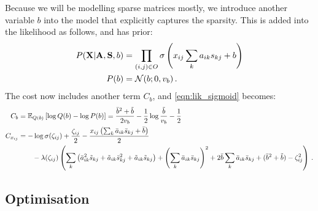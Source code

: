 \documentclass{article}
\newcommand{\obs}{O}
\newcommand{\X}{\mathbf{X}}
\newcommand{\A}{\mathbf{A}}
\newcommand{\s}{\mathbf{S}}
\newcommand{\N}{\mathcal{N}}
\newcommand{\atil}{\tilde{a}}
\newcommand{\abar}{\bar{a}}
\newcommand{\stil}{\tilde{s}}
\newcommand{\sbar}{\bar{s}}
\newcommand{\btil}{\tilde{b}}
\newcommand{\bbar}{\bar{b}}
\newcommand{\E}{\mathbb{E}}
\begin{document}
Because we will be modelling sparse matrices mostly, we introduce another variable $b$ into the model that explicitly captures the sparsity.
This is added into the likelihood as follows, and has prior:
\begin{align}
P(\X|\A,\s,b) &= \prod_{(i,j)\in\obs} \sigma \left(x_{ij}\sum_k a_{ik}s_{kj}+b\right)\notag\\
P(b) &= \N(b; 0, v_b) \notag\,.
\end{align}
The cost now includes another term $C_b$, and \eqref{eqn:lik_sigmoid} becomes:
\begin{align}
C_b &= \E_{Q(b)}\left[\log Q(b) - \log P(b)  \right]=\frac{\bbar^2+\btil}{2v_b}-\frac{1}{2}\log \frac{\btil}{v_b} - \frac{1}{2}\notag\\
C_{x_{ij}}
&=-\log\sigma(\zeta_{ij})+\frac{\zeta_{ij}}{2}-\frac{x_{ij}\left( \sum_k\abar_{ik}\sbar_{kj}+\bbar \right)}{2}\notag\\
&\qquad -\lambda(\zeta_{ij})\left(
\sum_k\left(\abar_{ik}^2\stil_{kj}+\atil_{ik}\sbar^2_{kj}+\atil_{ik}\stil_{kj}\right)+
\left(\sum_{k}\abar_{ik}\sbar_{kj}\right)^2+2\bbar\sum_k\abar_{ik}\sbar_{kj}+(\bbar^2+\btil)-\zeta_{ij}^2\right)\notag\,.
\end{align}

\subsection{Optimisation} \label{sec:optimisation}
\end{document}
